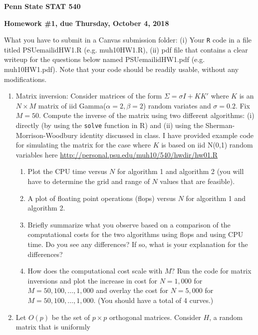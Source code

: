 \documentclass[10pt]{article}
\begin{document}
\begin{center}
{\bf Penn State STAT 540}

{\bf Homework \#1, due Thursday, October 4, 2018}\\

\end{center}
\noindent What you have to submit in a Canvas submission folder: (i)
Your {\tt R} code in a file titled PSUemailidHW1.R (e.g. muh10HW1.R),
(ii) pdf file that contains a clear writeup for the questions below
named PSUemailidHW1.pdf (e.g. muh10HW1.pdf). Note that
your code should be readily usable, without any modifications.
\begin{enumerate}
\item Matrix inversion: Consider matrices of the form $\Sigma=\sigma I
  + KK'$ where $K$ is an $N\times M$ matrix of iid Gamma($\alpha=2,\beta=2$) random
  variates and $\sigma=0.2$. Fix $M=50$. Compute the inverse of the
  matrix using two different algorithms: (i) directly (by using the
  {\tt solve} function in R) and (ii) using the Sherman-Morrison-Woodbury
  identity discussed in class. I have provided example code for
  simulating the matrix for the case where $K$ is based on iid N(0,1)
  random variables here
  \url{http://personal.psu.edu/muh10/540/hwdir/hw01.R} 
\begin{enumerate}
\item Plot the CPU time versus $N$ for algorithm 1 and
  algorithm 2 (you will have to determine the grid and range of $N$
  values that are feasible).
\item A plot of floating point operations (flops) versus
  $N$ for algorithm 1 and algorithm 2.
\item Briefly summarize what you
  observe based on a comparison of the computational costs for the two
  algorithms using flops and using CPU time. Do you see any
  differences? If so, what is your explanation for the differences?
\item How does the computational cost scale with $M$? Run the code for
  matrix inversions and plot the
  increase in cost for $N=1,000$ for $M=50,100,\dots,1,000$ and
  overlay the cost for $N=5,000$ for $M=50,100,\dots,1,000$. (You
  should have a total of 4 curves.)
\end{enumerate}
\item Let $O(p)$ be the set of $p \times p$ orthogonal
  matrices. Consider $H$, a random matrix that is uniformly

\end{enumerate}
\end{document}
